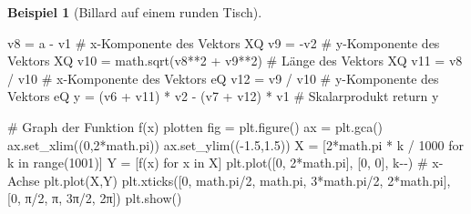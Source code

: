 \documentclass[
  a4paper,
  DIV=11]{scrreprt}
\newenvironment{Shaded}{\begin{snugshade}}{\end{snugshade}}
\newcommand{\BuiltInTok}[1]{\textcolor[rgb]{0.00,0.23,0.31}{#1}}
\newcommand{\CommentTok}[1]{\textcolor[rgb]{0.37,0.37,0.37}{#1}}
\newcommand{\ControlFlowTok}[1]{\textcolor[rgb]{0.00,0.23,0.31}{#1}}
\newcommand{\DecValTok}[1]{\textcolor[rgb]{0.68,0.00,0.00}{#1}}
\newcommand{\FloatTok}[1]{\textcolor[rgb]{0.68,0.00,0.00}{#1}}
\newcommand{\KeywordTok}[1]{\textcolor[rgb]{0.00,0.23,0.31}{#1}}
\newcommand{\NormalTok}[1]{\textcolor[rgb]{0.00,0.23,0.31}{#1}}
\newcommand{\OperatorTok}[1]{\textcolor[rgb]{0.37,0.37,0.37}{#1}}
\newcommand{\StringTok}[1]{\textcolor[rgb]{0.13,0.47,0.30}{#1}}
\theoremstyle{definition}
\theoremstyle{definition}
\newtheorem{example}{Beispiel}[chapter]
\theoremstyle{remark}
\begin{document}
\begin{example}[Billard auf einem runden
Tisch]
\begin{Shaded}
\begin{Highlighting}[]
\NormalTok{    v8 }\OperatorTok{=}\NormalTok{ a }\OperatorTok{{-}}\NormalTok{ v1        }\CommentTok{\# x{-}Komponente des Vektors XQ}
\NormalTok{    v9 }\OperatorTok{=} \OperatorTok{{-}}\NormalTok{v2           }\CommentTok{\# y{-}Komponente des Vektors XQ}
\NormalTok{    v10 }\OperatorTok{=}\NormalTok{ math.sqrt(v8}\OperatorTok{**}\DecValTok{2} \OperatorTok{+}\NormalTok{ v9}\OperatorTok{**}\DecValTok{2}\NormalTok{)  }\CommentTok{\# Länge des Vektors XQ}
\NormalTok{    v11 }\OperatorTok{=}\NormalTok{ v8 }\OperatorTok{/}\NormalTok{ v10     }\CommentTok{\# x{-}Komponente des Vektors eQ    }
\NormalTok{    v12 }\OperatorTok{=}\NormalTok{ v9 }\OperatorTok{/}\NormalTok{ v10     }\CommentTok{\# y{-}Komponente des Vektors eQ   }
\NormalTok{    y }\OperatorTok{=}\NormalTok{ (v6 }\OperatorTok{+}\NormalTok{ v11) }\OperatorTok{*}\NormalTok{ v2 }\OperatorTok{{-}}\NormalTok{ (v7 }\OperatorTok{+}\NormalTok{ v12) }\OperatorTok{*}\NormalTok{ v1  }\CommentTok{\# Skalarprodukt}
    \ControlFlowTok{return}\NormalTok{ y   }

\CommentTok{\# Graph der Funktion f(x) plotten}
\NormalTok{fig }\OperatorTok{=}\NormalTok{ plt.figure()}
\NormalTok{ax }\OperatorTok{=}\NormalTok{ plt.gca()}
\NormalTok{ax.set\_xlim((}\DecValTok{0}\NormalTok{,}\DecValTok{2}\OperatorTok{*}\NormalTok{math.pi))}
\NormalTok{ax.set\_ylim((}\OperatorTok{{-}}\FloatTok{1.5}\NormalTok{,}\FloatTok{1.5}\NormalTok{))}
\NormalTok{X }\OperatorTok{=}\NormalTok{ [}\DecValTok{2}\OperatorTok{*}\NormalTok{math.pi }\OperatorTok{*}\NormalTok{ k }\OperatorTok{/} \DecValTok{1000} \ControlFlowTok{for}\NormalTok{ k }\KeywordTok{in} \BuiltInTok{range}\NormalTok{(}\DecValTok{1001}\NormalTok{)]}
\NormalTok{Y }\OperatorTok{=}\NormalTok{ [f(x) }\ControlFlowTok{for}\NormalTok{ x }\KeywordTok{in}\NormalTok{ X]}
\NormalTok{plt.plot([}\DecValTok{0}\NormalTok{, }\DecValTok{2}\OperatorTok{*}\NormalTok{math.pi], [}\DecValTok{0}\NormalTok{, }\DecValTok{0}\NormalTok{], }\StringTok{\textquotesingle{}k{-}{-}\textquotesingle{}}\NormalTok{) }\CommentTok{\# x{-}Achse}
\NormalTok{plt.plot(X,Y)}
\NormalTok{plt.xticks([}\DecValTok{0}\NormalTok{, math.pi}\OperatorTok{/}\DecValTok{2}\NormalTok{, math.pi, }\DecValTok{3}\OperatorTok{*}\NormalTok{math.pi}\OperatorTok{/}\DecValTok{2}\NormalTok{, }\DecValTok{2}\OperatorTok{*}\NormalTok{math.pi],}
\NormalTok{           [}\StringTok{\textquotesingle{}0\textquotesingle{}}\NormalTok{, }\StringTok{\textquotesingle{}π/2\textquotesingle{}}\NormalTok{, }\StringTok{\textquotesingle{}π\textquotesingle{}}\NormalTok{, }\StringTok{\textquotesingle{}3π/2\textquotesingle{}}\NormalTok{, }\StringTok{\textquotesingle{}2π\textquotesingle{}}\NormalTok{])}
\NormalTok{plt.show()  }
\end{Highlighting}
\end{Shaded}


\end{example}
\end{document}
